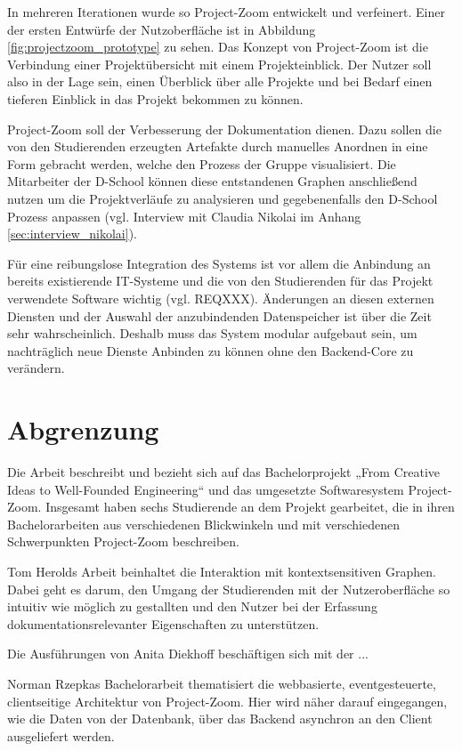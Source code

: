 In mehreren Iterationen wurde so Project-Zoom entwickelt und verfeinert. Einer der ersten Entwürfe der Nutzoberfläche ist in Abbildung \ref{fig:projectzoom_prototype} zu sehen. Das Konzept von Project-Zoom ist die Verbindung einer Projektübersicht mit einem Projekteinblick. Der Nutzer soll also in der Lage sein, einen Überblick über alle Projekte und bei Bedarf einen tieferen Einblick in das Projekt bekommen zu können.

Project-Zoom soll der Verbesserung der Dokumentation dienen. Dazu sollen die von den Studierenden erzeugten Artefakte durch manuelles Anordnen in eine Form gebracht werden, welche den Prozess der Gruppe visualisiert. Die Mitarbeiter der D-School können diese entstandenen Graphen anschließend nutzen um die Projektverläufe zu analysieren und gegebenenfalls den D-School Prozess anpassen (vgl. Interview mit Claudia Nikolai im Anhang \ref{sec:interview_nikolai}).

Für eine reibungslose Integration des Systems ist vor allem die Anbindung an bereits existierende IT-Systeme  und die von den Studierenden für das Projekt verwendete Software wichtig (vgl. REQXXX). Änderungen an diesen externen Diensten und der Auswahl der anzubindenden Datenspeicher ist über die Zeit sehr wahrscheinlich. Deshalb muss das System modular aufgebaut sein, um nachträglich neue Dienste Anbinden zu können ohne den Backend-Core zu verändern.

\section{Abgrenzung}
Die Arbeit beschreibt und bezieht sich auf das Bachelorprojekt „From Creative Ideas to Well-Founded Engineering“ und das umgesetzte Softwaresystem Project-Zoom. Insgesamt haben sechs Studierende an dem Projekt gearbeitet, die in ihren Bachelorarbeiten aus verschiedenen Blickwinkeln und mit verschiedenen Schwerpunkten Project-Zoom beschreiben.

Tom Herolds Arbeit \cite{bp-tomh} beinhaltet die Interaktion mit kontextsensitiven Graphen. Dabei geht es darum, den Umgang der Studierenden mit der Nutzeroberfläche so intuitiv wie möglich zu gestallten und den Nutzer bei der Erfassung dokumentationsrelevanter Eigenschaften zu unterstützen.

Die Ausführungen von Anita Diekhoff \cite{bp-anita}  beschäftigen sich mit der ...

Norman Rzepkas Bachelorarbeit \cite{bp-norman} thematisiert die webbasierte, eventgesteuerte, clientseitige Architektur von Project-Zoom. Hier wird näher darauf eingegangen, wie die Daten von der Datenbank, über das Backend asynchron an den Client ausgeliefert werden.

